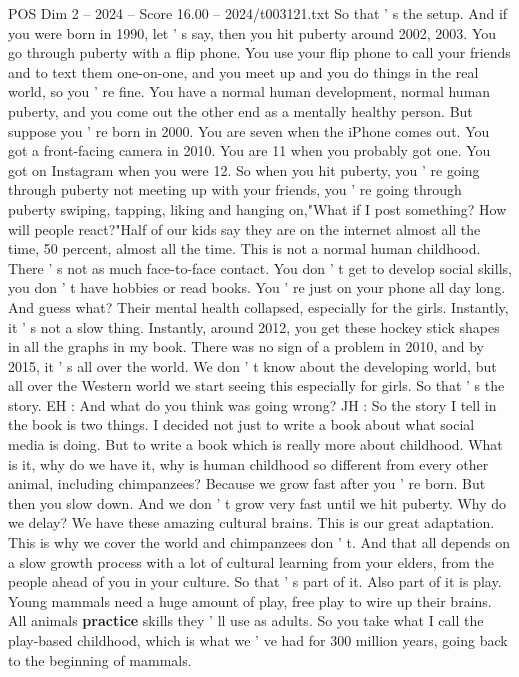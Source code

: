 \begin{textsample}{POS Dim 2 – 2024 – Score 16.00 – 2024/t003121.txt}
So that ' s the setup.
And if you were born in 1990, let ' s say, then you hit puberty around 2002, 2003.
You go through puberty with a flip phone.
You use your flip phone to call your friends and to text them one-on-one, and you meet up and you do things in the real world, so you ' re fine.
You have a normal human development, normal human puberty, and you come out the other end as a mentally healthy person.
But suppose you ' re born in 2000.
You are seven when the iPhone comes out.
You got a front-facing camera in 2010.
You are 11 when you probably got one.
You got on Instagram when you were 12.
So when you hit puberty, you ' re going through puberty not meeting up with your friends, you ' re going through puberty swiping, tapping, liking and hanging on,"What if I post something?
How will people react?"Half of our kids say they are on the internet almost all the time, 50 percent, almost all the time.
This is not a normal human childhood.
There ' s not as much face-to-face contact.
You don ' t get to develop social skills, you don ' t have hobbies or read books.
You ' re just on your phone all day long.
And guess what?
Their mental health collapsed, especially for the girls.
Instantly, it ' s not a slow thing.
Instantly, around 2012, you get these hockey stick shapes in all the graphs in my book.
There was no sign of a problem in 2010, and by 2015, it ' s all over the world.
We don ' t know about the developing world, but all over the Western world we start seeing this especially for girls.
So that ' s the story.
EH : And what do you think was going wrong?
JH : So the story I tell in the book is two things.
I decided not just to write a book about what social media is doing.
But to write a book which is really more about childhood.
What is it, why do we have it, why is human childhood so different from every other animal, including chimpanzees?
Because we grow fast after you ' re born.
But then you slow down.
And we don ' t grow very fast until we hit puberty.
Why do we delay?
We have these amazing cultural brains.
This is our great adaptation.
This is why we cover the world and chimpanzees don ' t.
And that all depends on a slow growth process with a lot of cultural learning from your elders, from the people ahead of you in your culture.
So that ' s part of it.
Also part of it is play.
Young mammals need a huge amount of play, free play to wire up their brains.
All animals \textbf{practice} skills they ' ll use as adults.
So you take what I call the play-based childhood, which is what we ' ve had for 300 million years, going back to the beginning of mammals.

\end{textsample}
